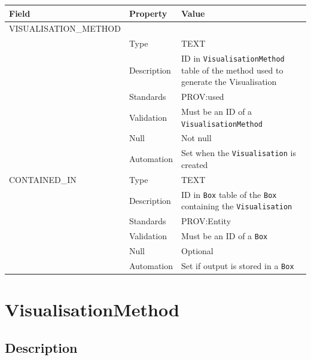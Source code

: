 \documentclass[
]{article}
\newcounter{none}
\begin{document}
{\def\LTcaptype{none} 
\begin{longtable}[]{@{}
  >{\raggedright\arraybackslash}p{}
  >{\raggedright\arraybackslash}p{}
  >{\raggedright\arraybackslash}p{}@{}}
\toprule\noalign{}
\begin{minipage}[b]{\linewidth}\raggedright
Field
\end{minipage} & \begin{minipage}[b]{\linewidth}\raggedright
Property
\end{minipage} & \begin{minipage}[b]{\linewidth}\raggedright
Value
\end{minipage} \\
\midrule\noalign{}
\endhead
\bottomrule\noalign{}
\endlastfoot
VISUALISATION\_METHOD & & \\
& Type & TEXT \\
& Description & ID in \texttt{VisualisationMethod} table of the method
used to generate the Visualisation \\
& Standards & PROV:used \\
& Validation & Must be an ID of a \texttt{VisualisationMethod} \\
& Null & Not null \\
& Automation & Set when the \texttt{Visualisation} is created \\
CONTAINED\_IN & Type & TEXT \\
& Description & ID in \texttt{Box} table of the \texttt{Box} containing
the \texttt{Visualisation} \\
& Standards & PROV:Entity \\
& Validation & Must be an ID of a \texttt{Box} \\
& Null & Optional \\
& Automation & Set if output is stored in a \texttt{Box} \\
\end{longtable}
}

\section{VisualisationMethod}\label{visualisationmethod}

\subsection{Description}\label{description-40}
\end{document}
